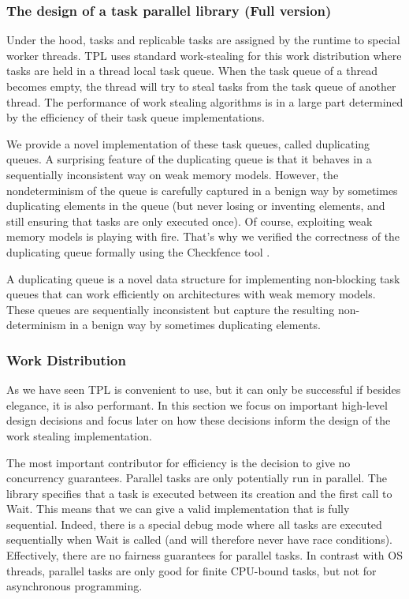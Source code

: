 \subsubsection{The design of a task parallel library \cite{Leijen2009} (Full version)}

Under the hood, tasks and replicable tasks are assigned by the runtime
to special worker threads. TPL uses standard work-stealing for this
work distribution \cite{Frigo1998} where tasks are held in a thread
local task queue. When the task queue of a thread becomes empty, the
thread will try to steal tasks from the task queue of another
thread. The performance of work stealing algorithms is in a large part
determined by the efficiency of their task queue implementations.

We provide a novel implementation of these task queues, called
duplicating queues. A surprising feature of the duplicating queue is
that it behaves in a sequentially inconsistent way on weak memory
models. However, the nondeterminism of the queue is carefully captured
in a benign way by sometimes duplicating elements in the queue (but
never losing or inventing elements, and still ensuring that tasks are
only executed once). Of course, exploiting weak memory models is
playing with fire. That's why we verified the correctness of the
duplicating queue formally using the Checkfence tool
\cite{Burckhardt2007, Burckhardt2007a}.

A duplicating queue is a novel data structure for implementing
non-blocking task queues that can work efficiently on architectures
with weak memory models. These queues are sequentially inconsistent
but capture the resulting non-determinism in a benign way by sometimes
duplicating elements.

\subsubsection{Work Distribution}

As we have seen TPL is convenient to use, but it can only be
successful if besides elegance, it is also performant. In this section
we focus on important high-level design decisions and focus later on
how these decisions inform the design of the work stealing
implementation.


The most important contributor for efficiency is the decision to give
no concurrency guarantees. Parallel tasks are only potentially run in
parallel. The library specifies that a task is executed between its
creation and the first call to Wait. This means that we can give a
valid implementation that is fully sequential. Indeed, there is a
special debug mode where all tasks are executed sequentially when Wait
is called (and will therefore never have race
conditions). Effectively, there are no fairness guarantees for
parallel tasks. In contrast with OS threads, parallel tasks are only
good for finite CPU-bound tasks, but not for asynchronous programming.

